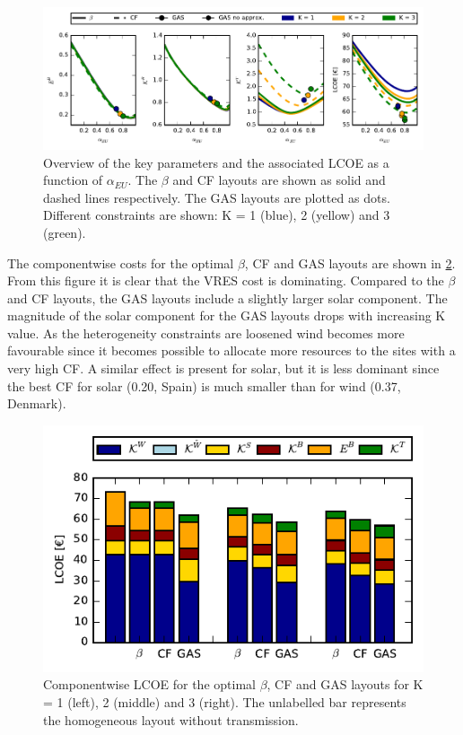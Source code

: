 \documentclass[a4paper, 5p, sort&compress]{elsarticle}%
\begin{document}
\begin{figure}[t!]
  \centering
  \includegraphics[width = 2\columnwidth]{dataSync-new}
  \caption{Overview of the key parameters and the associated LCOE as a
    function of $\alpha_{EU}$. The $\beta$ %
    and CF %
    layouts are shown as solid and dashed lines respectively. The GAS
    layouts are plotted as dots. Different constraints are shown: K =
    1 (blue), 2 (yellow) and 3 (green).}
  \label{fig:overview}
\end{figure}

The componentwise costs for the optimal $\beta$, CF and GAS layouts are
shown in \cref{fig:cost}. From this figure it is clear that the VRES
cost is dominating. Compared to the $\beta$ and CF layouts, the GAS
layouts include a slightly larger solar component. The magnitude of
the solar component for the GAS layouts drops with increasing K
value. As the heterogeneity constraints are loosened wind becomes more
favourable since it becomes possible to allocate more resources to the
sites with a very high CF. A similar effect is present for solar, but
it is less dominant since the best CF for solar (0.20, Spain) is much
smaller than for wind (0.37, Denmark).

\begin{figure}[h!]
  \centering
  \includegraphics[width = \columnwidth]{costVE50}
  \caption{Componentwise LCOE for the optimal $\beta$, CF and GAS layouts
    for K = 1 (left), 2 (middle) and 3 (right). The unlabelled bar
    represents the homogeneous layout without transmission.}
  \label{fig:cost}
\end{figure}
\end{document}
